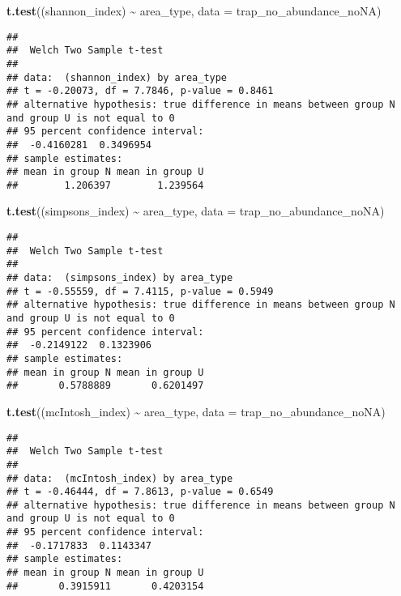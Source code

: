 \documentclass[
]{article}
\newenvironment{Shaded}{\begin{snugshade}}{\end{snugshade}}
\newcommand{\AttributeTok}[1]{\textcolor[rgb]{0.13,0.29,0.53}{#1}}
\newcommand{\FunctionTok}[1]{\textcolor[rgb]{0.13,0.29,0.53}{\textbf{#1}}}
\newcommand{\NormalTok}[1]{#1}
\newcommand{\SpecialCharTok}[1]{\textcolor[rgb]{0.81,0.36,0.00}{\textbf{#1}}}
\begin{document}
\begin{Shaded}
\begin{Highlighting}[]
\FunctionTok{t.test}\NormalTok{((shannon\_index) }\SpecialCharTok{\textasciitilde{}}\NormalTok{ area\_type, }\AttributeTok{data =}\NormalTok{ trap\_no\_abundance\_noNA)}
\end{Highlighting}
\end{Shaded}

\begin{verbatim}
## 
##  Welch Two Sample t-test
## 
## data:  (shannon_index) by area_type
## t = -0.20073, df = 7.7846, p-value = 0.8461
## alternative hypothesis: true difference in means between group N and group U is not equal to 0
## 95 percent confidence interval:
##  -0.4160281  0.3496954
## sample estimates:
## mean in group N mean in group U 
##        1.206397        1.239564
\end{verbatim}

\begin{Shaded}
\begin{Highlighting}[]
\FunctionTok{t.test}\NormalTok{((simpsons\_index) }\SpecialCharTok{\textasciitilde{}}\NormalTok{ area\_type, }\AttributeTok{data =}\NormalTok{ trap\_no\_abundance\_noNA)}
\end{Highlighting}
\end{Shaded}

\begin{verbatim}
## 
##  Welch Two Sample t-test
## 
## data:  (simpsons_index) by area_type
## t = -0.55559, df = 7.4115, p-value = 0.5949
## alternative hypothesis: true difference in means between group N and group U is not equal to 0
## 95 percent confidence interval:
##  -0.2149122  0.1323906
## sample estimates:
## mean in group N mean in group U 
##       0.5788889       0.6201497
\end{verbatim}

\begin{Shaded}
\begin{Highlighting}[]
\FunctionTok{t.test}\NormalTok{((mcIntosh\_index) }\SpecialCharTok{\textasciitilde{}}\NormalTok{ area\_type, }\AttributeTok{data =}\NormalTok{ trap\_no\_abundance\_noNA)}
\end{Highlighting}
\end{Shaded}

\begin{verbatim}
## 
##  Welch Two Sample t-test
## 
## data:  (mcIntosh_index) by area_type
## t = -0.46444, df = 7.8613, p-value = 0.6549
## alternative hypothesis: true difference in means between group N and group U is not equal to 0
## 95 percent confidence interval:
##  -0.1717833  0.1143347
## sample estimates:
## mean in group N mean in group U 
##       0.3915911       0.4203154
\end{verbatim}
\end{document}
